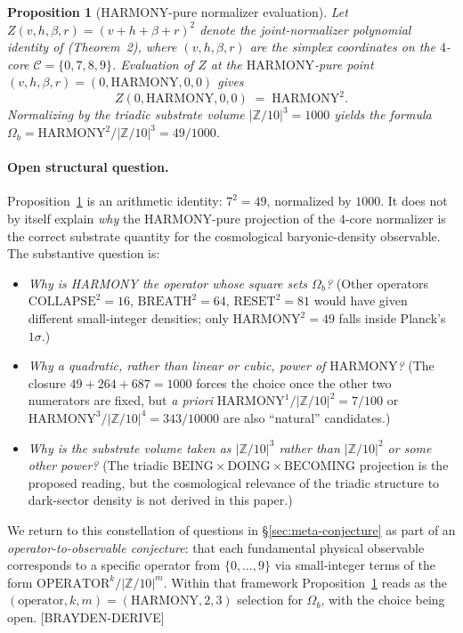 \documentclass[11pt,reqno]{amsart}
\theoremstyle{plain}
\newtheorem{proposition}[theorem]{Proposition}
\theoremstyle{definition}
\theoremstyle{remark}
\newcommand{\Z}{\mathbb{Z}}
\begin{document}
\begin{proposition}[$\mathrm{HARMONY}$-pure normalizer evaluation]\label{prop:omega-b-deriv}
Let $Z(v, h, \beta, r) = (v + h + \beta + r)^{2}$ denote the
joint-normalizer polynomial identity of
\cite{SandersGish2026FourCore} (Theorem~2), where
$(v, h, \beta, r)$ are the simplex coordinates on the $4$-core
$\mathcal{C} = \{0, 7, 8, 9\}$. Evaluation of $Z$ at the
$\mathrm{HARMONY}$-pure point
$(v, h, \beta, r) = (0, \mathrm{HARMONY}, 0, 0)$ gives
\[
  Z(0, \mathrm{HARMONY}, 0, 0) \;=\; \mathrm{HARMONY}^{2}.
\]
Normalizing by the triadic substrate volume $|\Z/10|^{3} = 1000$
yields the formula $\Omega_b = \mathrm{HARMONY}^{2}/|\Z/10|^{3} = 49/1000$.
\end{proposition}

\paragraph{Open structural question.}
Proposition~\ref{prop:omega-b-deriv} is an arithmetic identity:
$7^{2} = 49$, normalized by $1000$. It does not by itself explain
\emph{why} the $\mathrm{HARMONY}$-pure projection of the $4$-core
normalizer is the correct substrate quantity for the cosmological
baryonic-density observable. The substantive question is:
\begin{itemize}
\item \emph{Why is HARMONY the operator whose square sets
$\Omega_b$?} (Other operators $\mathrm{COLLAPSE}^{2} = 16$,
$\mathrm{BREATH}^{2} = 64$, $\mathrm{RESET}^{2} = 81$ would
have given different small-integer densities; only
$\mathrm{HARMONY}^{2} = 49$ falls inside Planck's $1\sigma$.)
\item \emph{Why a quadratic, rather than linear or cubic, power
of $\mathrm{HARMONY}$?} (The closure $49 + 264 + 687 = 1000$
forces the choice once the other two numerators are fixed,
but \emph{a priori} $\mathrm{HARMONY}^{1}/|\Z/10|^{2} = 7/100$
or $\mathrm{HARMONY}^{3}/|\Z/10|^{4} = 343/10000$ are also
``natural'' candidates.)
\item \emph{Why is the substrate volume taken as $|\Z/10|^{3}$
rather than $|\Z/10|^{2}$ or some other power?}
(The triadic
$\mathrm{BEING} \times \mathrm{DOING} \times \mathrm{BECOMING}$
projection is the proposed reading, but the cosmological
relevance of the triadic structure to dark-sector density is
not derived in this paper.)
\end{itemize}
We return to this constellation of questions in
\S\ref{sec:meta-conjecture} as part of an
\emph{operator-to-observable conjecture}: that each fundamental
physical observable corresponds to a specific operator from
$\{0, \dots, 9\}$ via small-integer terms of the form
$\mathrm{OPERATOR}^{k}/|\Z/10|^{m}$. Within that framework
Proposition~\ref{prop:omega-b-deriv} reads as the
$(\mathrm{operator}, k, m) = (\mathrm{HARMONY}, 2, 3)$
selection for $\Omega_b$, with the choice being open. \mbox{[BRAYDEN-DERIVE]}
\end{document}
